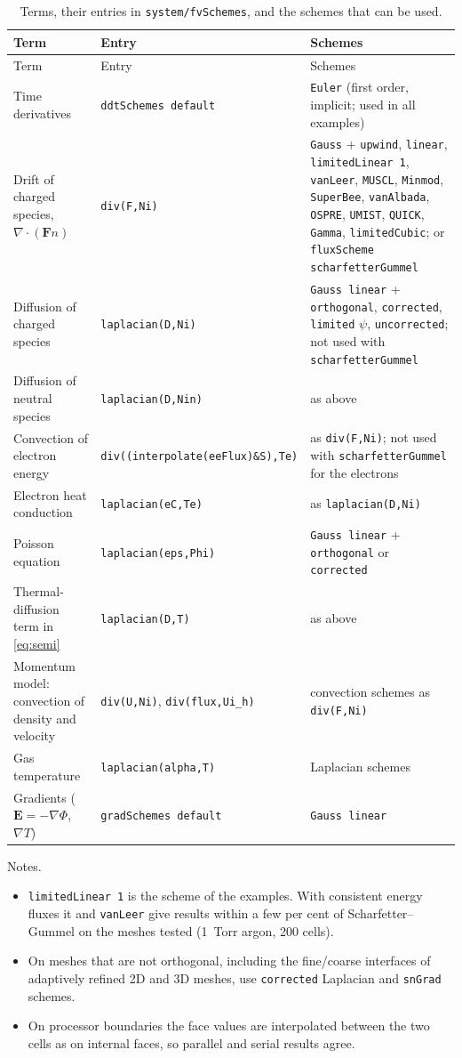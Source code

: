 \documentclass[11pt,a4paper]{article}
\newcommand{\kw}[1]{\texttt{#1}}
\newcommand{\bE}{\mathbf{E}}
\begin{document}
\begin{longtable}{@{}L{3.5cm}L{6.3cm}L{5.4cm}@{}}
\caption{Terms, their entries in \kw{system/fvSchemes}, and the schemes that
can be used.\label{tab:schemes}}\\
\toprule
Term & Entry & Schemes \\
\midrule
\endfirsthead
\toprule
Term & Entry & Schemes \\
\midrule
\endhead
\bottomrule
\endfoot
Time derivatives & \kw{ddtSchemes default} & \kw{Euler} (first order, implicit; used in all examples) \\[3pt]
Drift of charged species, $\nabla\cdot(\mathbf{F}n)$ & \kw{div(F,Ni)} & \kw{Gauss} + \kw{upwind}, \kw{linear}, \kw{limitedLinear 1}, \kw{vanLeer}, \kw{MUSCL}, \kw{Minmod}, \kw{SuperBee}, \kw{vanAlbada}, \kw{OSPRE}, \kw{UMIST}, \kw{QUICK}, \kw{Gamma}, \kw{limitedCubic}; or \kw{fluxScheme scharfetterGummel} \\[3pt]
Diffusion of charged species & \kw{laplacian(D,Ni)} & \kw{Gauss linear} + \kw{orthogonal}, \kw{corrected}, \kw{limited} $\psi$, \kw{uncorrected}; not used with \kw{scharfetterGummel} \\[3pt]
Diffusion of neutral species & \kw{laplacian(D,Nin)} & as above \\[3pt]
Convection of electron energy & \kw{div((interpolate(eeFlux)\&S),Te)} & as \kw{div(F,Ni)}; not used with \kw{scharfetterGummel} for the electrons \\[3pt]
Electron heat conduction & \kw{laplacian(eC,Te)} & as \kw{laplacian(D,Ni)} \\[3pt]
Poisson equation & \kw{laplacian(eps,Phi)} & \kw{Gauss linear} + \kw{orthogonal} or \kw{corrected} \\[3pt]
Thermal-diffusion term in \eqref{eq:semi} & \kw{laplacian(D,T)} & as above \\[3pt]
Momentum model: convection of density and velocity & \kw{div(U,Ni)}, \kw{div(flux,Ui\_h)} & convection schemes as \kw{div(F,Ni)} \\[3pt]
Gas temperature & \kw{laplacian(alpha,T)} & Laplacian schemes \\[3pt]
Gradients ($\bE=-\nabla\Phi$, $\nabla T$) & \kw{gradSchemes default} & \kw{Gauss linear} \\
\end{longtable}

\noindent Notes.
\begin{itemize}
\item \kw{limitedLinear 1} is the scheme of the examples. With consistent
      energy fluxes it and \kw{vanLeer} give results within a few per cent of
      Scharfetter--Gummel on the meshes tested (1~Torr argon, 200 cells).
\item On meshes that are not orthogonal, including the fine/coarse interfaces
      of adaptively refined 2D and 3D meshes, use \kw{corrected} Laplacian
      and \kw{snGrad} schemes.
\item On processor boundaries the face values are interpolated between the
      two cells as on internal faces, so parallel and serial results agree.
\end{itemize}
\end{document}
